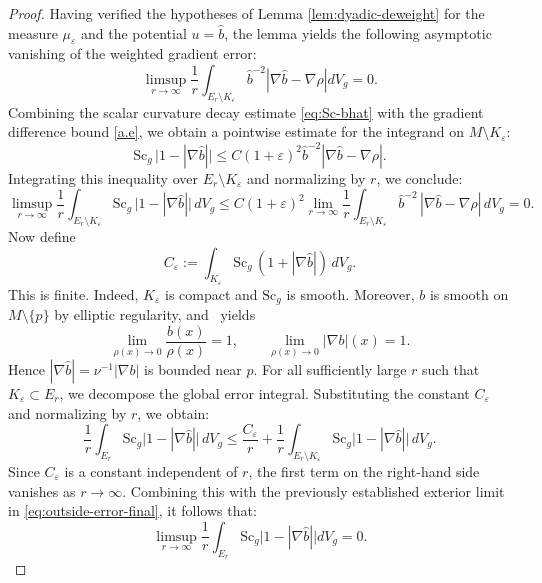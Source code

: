 \documentclass[12pt,oneside,a4paper]{article}
\theoremstyle{mytheorem}
\theoremstyle{remark}
\begin{document}
\begin{proof}
Having verified the hypotheses of Lemma \ref{lem:dyadic-deweight} for the measure $\mu_\varepsilon$ and the potential $u = \widehat{b}$, the lemma yields the following asymptotic vanishing of the weighted gradient error:$$\limsup_{r \to \infty} \frac{1}{r} \int_{E_r \setminus K_\varepsilon} \widehat{b}^{-2} |\nabla \widehat{b} - \nabla \rho|  dV_g = 0.$$  Combining the scalar curvature decay estimate \eqref{eq:Sc-bhat} with the gradient difference bound \eqref{a.e}, we obtain a pointwise estimate for the integrand on $M \setminus K_\varepsilon$:$$\mathrm{Sc}_g \, \bigl| 1 - |\nabla \widehat{b}| \bigr| \le C(1+\varepsilon)^2 \widehat{b}^{-2} |\nabla \widehat{b} - \nabla \rho|.$$Integrating this inequality over  $E_r \setminus K_\varepsilon$ and normalizing by $r$, we conclude:\begin{equation}\label{eq:outside-error-final}
\limsup_{r \to \infty} \frac{1}{r}
\int_{E_r \setminus K_\varepsilon} \mathrm{Sc}_g \,\bigl| 1 - |\nabla \widehat{b}| \bigr| \, dV_g
\le
C(1+\varepsilon)^2 \lim_{r \to \infty} \frac{1}{r}
\int_{E_r \setminus K_\varepsilon} \widehat{b}^{-2} \, |\nabla \widehat{b} - \nabla \rho| \, dV_g
= 0.
\end{equation}
Now define
\[
C_\varepsilon
:=
\int_{K_\varepsilon}\mathrm{Sc}_g\,(1+|\nabla \widehat b|)\,dV_g.
\]
This is finite. Indeed, \(K_\varepsilon\) is compact and \(\mathrm{Sc}_g\) is smooth. Moreover, \(b\) is smooth on \(M \setminus \{p\}\) by elliptic regularity, and~\cite[(2.1)--(2.2)]{zbMATH07177335} yields
\[
\lim_{\rho(x)\to 0} \frac{b(x)}{\rho(x)} = 1,
\qquad
\lim_{\rho(x)\to 0} |\nabla b|(x) = 1.
\]
Hence \(|\nabla \widehat{b}| = \nu^{-1} |\nabla b|\) is bounded near \(p\). For all sufficiently large \(r\) such that \(K_\varepsilon \subset E_r\), we decompose the global error integral. Substituting the constant \(C_\varepsilon\) and normalizing by \(r\), we obtain:$$\frac{1}{r} \int_{E_r} \mathrm{Sc}_g \bigl| 1 - |\nabla \widehat{b}| \bigr| \, dV_g \le \frac{C_\varepsilon}{r} + \frac{1}{r} \int_{E_r \setminus K_\varepsilon} \mathrm{Sc}_g \bigl| 1 - |\nabla \widehat{b}| \bigr| \, dV_g.$$Since $C_\varepsilon$ is a constant independent of $r$, the first term on the right-hand side vanishes as $r \to \infty$. Combining this with the previously established exterior limit in \eqref{eq:outside-error-final}, it follows that:$$\limsup_{r \to \infty} \frac{1}{r} \int_{E_r} \mathrm{Sc}_g \bigl| 1 - |\nabla \widehat{b}| \bigr|dV_g = 0.$$


\end{proof}
\end{document}
